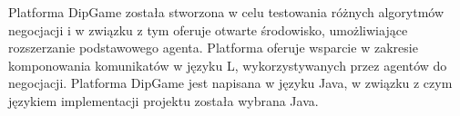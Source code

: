 Platforma DipGame została stworzona w celu testowania różnych algorytmów negocjacji i w związku z tym oferuje
otwarte środowisko, umożliwiające rozszerzanie podstawowego agenta. Platforma oferuje wsparcie w zakresie
komponowania komunikatów w języku L, wykorzystywanych przez agentów do negocjacji. Platforma DipGame jest
napisana w języku Java, w związku z czym językiem implementacji projektu została wybrana Java.
